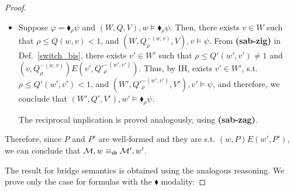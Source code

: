 \begin{proof}
\begin{itemize}
        \item Suppose $\varphi= \blacklozenge_\rho \psi$ and $(W,{Q},V),w\models \blacklozenge_\rho \psi$. Then, there exists  $v\in W$ such that  $\rho\leq {Q}(w,v) < 1$,  and  $(W,{Q}^{-(w,v)}_\rho,V), v \models\psi$. From \textbf{(sab-zig)} in Def.~\ref{switch_bis}, there exists $v'\in W'$ such that $\rho\leq {Q}'(w',v') \neq 1$  and $(v,{Q}^{-(w,v)}_\rho)E(v',{Q}'^{-(w',v')}_\rho)$. Thus, by IH, exists $v'\in W'$, s.t. $\rho\leq {Q}'(w',v')<1$, and $(W',{Q}'^{-(w',v')}_\rho,V'), v' \models\psi$, and therefore, we conclude that $(W',{Q}',V'), w'\models\blacklozenge_\rho\psi$.

        The reciprocal implication is proved analogously, using \textbf{(sab-zag)}.
    \end{itemize}

    Therefore, since $P$ and $P'$ are well-formed and they are s.t. $(w,P)E(w',P')$, we can conclude that $\mathcal{M},w\equiv_{\mathsf{sb}}\mathcal{M}',w'$.
    



    The result for bridge semantics is obtained using the analogous reasoning. We prove only the case for formulas with the $\blacklozenge$ modality:


\end{proof}
